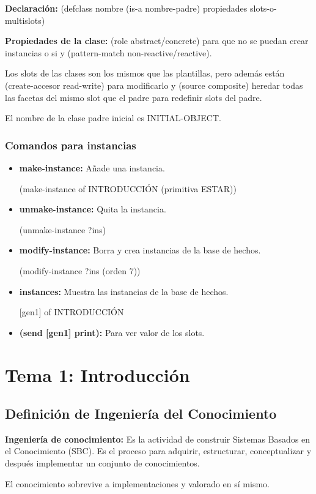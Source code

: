 \documentclass[12pt, twoside, openright]{report} %
\begin{document}
\textbf{Declaración:} (defclass nombre (is-a nombre-padre) propiedades slots-o-multislots)

\textbf{Propiedades de la clase:} (role abstract/concrete) para que no se puedan crear instancias o si y (pattern-match non-reactive/reactive).

Los slots de las clases son los mismos que las plantillas, pero además están (create-accesor read-write) para modificarlo y (source composite) heredar todas las facetas del mismo slot que el padre para redefinir slots del padre.

El nombre de la clase padre inicial es INITIAL-OBJECT.

\subsection{Comandos para instancias}
\begin{itemize}
	\item \textbf{make-instance:} Añade una instancia.

	      (make-instance of INTRODUCCIÓN (primitiva ESTAR))
	\item \textbf{unmake-instance:} Quita la instancia.

	      (unmake-instance ?ins)
	\item \textbf{modify-instance:} Borra y crea instancias de la base de hechos.

	      (modify-instance ?ins (orden 7))
	\item \textbf{instances:} Muestra las instancias de la base de hechos.

	      [gen1] of INTRODUCCIÓN
	\item \textbf{(send [gen1] print):} Para ver valor de los slots.
\end{itemize}

\chapter{Tema 1: Introducción}
\section{Definición de Ingeniería del Conocimiento}

\textbf{Ingeniería de conocimiento:} Es la actividad de construir Sistemas Basados en el Conocimiento (SBC). Es el proceso para adquirir, estructurar, conceptualizar y después implementar un conjunto de conocimientos.

El conocimiento sobrevive a implementaciones y valorado en sí mismo.
\end{document}
